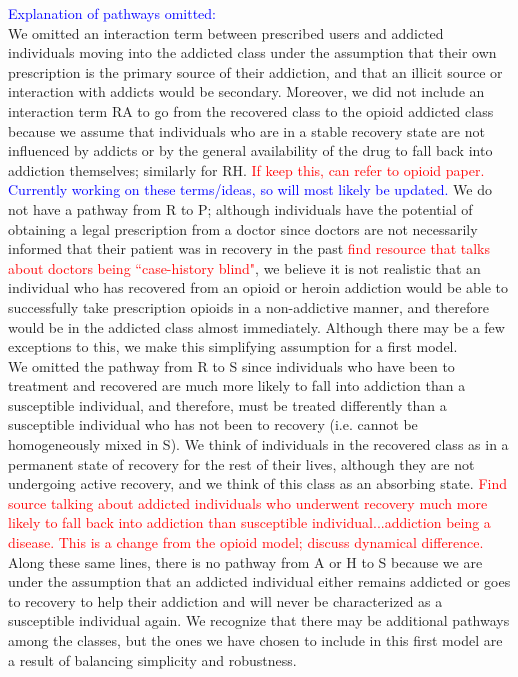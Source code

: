 \documentclass[12pt]{article}
\begin{document}
\textcolor{blue}{Explanation of pathways omitted:} \\
We omitted an interaction term between prescribed users and addicted individuals moving into the addicted class under the assumption that their own prescription is the primary source of their addiction, and that an illicit source or interaction with addicts would be secondary. Moreover, we did not include an interaction term RA to go from the recovered class to the opioid addicted class because we assume that individuals who are in a stable recovery state are not influenced by addicts or by the general availability of the drug to fall back into addiction themselves; similarly for RH. \textcolor{red}{If keep this, can refer to opioid paper.} \textcolor{blue}{Currently working on these terms/ideas, so will most likely be updated.}  We do not have a pathway from R to P; although individuals have the potential of obtaining a legal prescription from a doctor since doctors are not necessarily informed that their patient was in recovery in the past \textcolor{red}{find resource that talks about doctors being ``case-history blind"}, we believe it is not realistic that an individual who has recovered from an opioid or heroin addiction would be able to successfully take prescription opioids in a non-addictive manner, and therefore would be in the addicted class almost immediately. Although there may be a few exceptions to this, we make this simplifying assumption for a first model. \\


We omitted the pathway from R to S since individuals who have been to treatment and recovered are much more likely to fall into addiction than a susceptible individual, and therefore, must be treated differently than a susceptible individual who has not been to recovery (i.e. cannot be homogeneously mixed in S). We think of individuals in the recovered class as in a permanent state of recovery for the rest of their lives, although they are not undergoing active recovery, and we think of this class as an absorbing state. \textcolor{red}{Find source talking about addicted individuals who underwent recovery much more likely to fall back into addiction than susceptible individual...addiction being a disease.} \textcolor{red}{This is a change from the opioid model; discuss dynamical difference.} Along these same lines, there is no pathway from A or H to S because we are under the assumption that an addicted individual either remains addicted or goes to recovery to help their addiction and will never be characterized as a susceptible individual again. We recognize that there may be additional pathways among the classes, but the ones we have chosen to include in this first model are a result of balancing simplicity and robustness. \\ 
\end{document}
